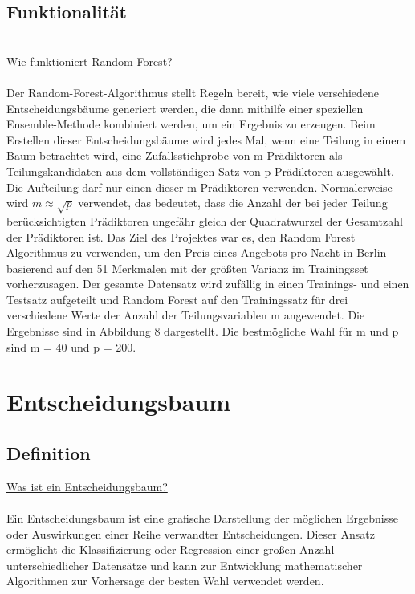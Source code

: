 \documentclass[12pt]{article}
\begin{document}
\begin{text}
\subsection{Funktionalität}\\
    \underline{Wie funktioniert Random Forest?}\\\\
Der Random-Forest-Algorithmus stellt Regeln bereit, wie viele verschiedene Entscheidungsbäume generiert werden, die dann mithilfe einer speziellen Ensemble-Methode kombiniert werden, um ein Ergebnis zu erzeugen. Beim Erstellen dieser Entscheidungsbäume wird jedes Mal, wenn eine Teilung in einem Baum betrachtet wird, eine Zufallsstichprobe von m Prädiktoren als Teilungskandidaten aus dem vollständigen Satz von p Prädiktoren ausgewählt. Die Aufteilung darf nur einen dieser m Prädiktoren verwenden. Normalerweise wird $m \approx \sqrt{p}$ verwendet, das bedeutet, dass die Anzahl der bei jeder Teilung berücksichtigten Prädiktoren ungefähr gleich der Quadratwurzel der Gesamtzahl der Prädiktoren ist. Das Ziel des Projektes war es, den Random Forest Algorithmus zu verwenden, um den Preis eines Angebots pro Nacht in Berlin  basierend auf den 51 Merkmalen mit der größten Varianz im Trainingsset vorherzusagen. Der gesamte Datensatz wird zufällig in einen Trainings- und einen Testsatz aufgeteilt und Random Forest auf den Trainingssatz für drei verschiedene Werte der Anzahl der Teilungsvariablen m angewendet. Die Ergebnisse sind in Abbildung 8 dargestellt. Die bestmögliche Wahl für m und p sind m = 40 und p = 200.
\\
\section{Entscheidungsbaum}
\subsection{Definition}
        \underline{Was ist ein Entscheidungsbaum?}\\\\
Ein Entscheidungsbaum ist eine grafische Darstellung der möglichen Ergebnisse oder Auswirkungen einer Reihe verwandter Entscheidungen. Dieser Ansatz ermöglicht die Klassifizierung oder Regression einer großen Anzahl unterschiedlicher Datensätze und kann zur Entwicklung mathematischer Algorithmen zur Vorhersage der besten Wahl verwendet werden.

\end{text}
\end{document}
